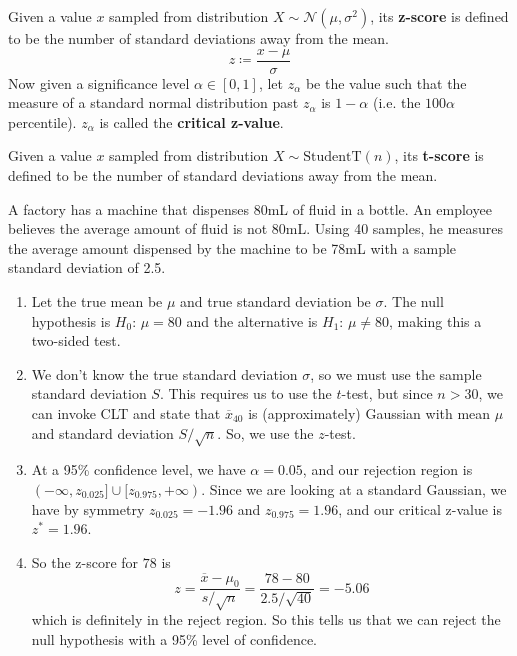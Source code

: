   \begin{definition}[Z-score]
    Given a value $x$ sampled from distribution $X \sim \mathcal{N}(\mu, \sigma^2)$, its \textbf{z-score} is defined to be the number of standard deviations away from the mean. 
    \begin{equation}
      z \coloneqq \frac{x - \mu}{\sigma}
    \end{equation}
    Now given a significance level $\alpha \in [0, 1]$, let $z_\alpha$ be the value such that the measure of a standard normal distribution past $z_\alpha$ is $1 - \alpha$ (i.e. the $100\alpha$ percentile). $z_\alpha$ is called the \textbf{critical z-value}.
  \end{definition}

  \begin{definition}[T-score]
    Given a value $x$ sampled from distribution $X \sim \mathrm{StudentT}(n)$, its \textbf{t-score} is defined to be the number of standard deviations away from the mean. 
  \end{definition}

  \begin{example}
    A factory has a machine that dispenses 80mL of fluid in a bottle. An employee believes the average amount of fluid is not 80mL. Using 40 samples, he measures the average amount dispensed by the machine to be 78mL with a sample standard deviation of 2.5. 
    \begin{enumerate}
      \item Let the true mean be $\mu$ and true standard deviation be $\sigma$. The null hypothesis is $H_0 : \, \mu = 80$ and the alternative is $H_1 : \, \mu \neq 80$, making this a two-sided test. 
      
      \item We don't know the true standard deviation $\sigma$, so we must use the sample standard deviation $S$. This requires us to use the $t$-test, but since $n > 30$, we can invoke CLT and state that $\overline{x}_{40}$ is (approximately) Gaussian with mean $\mu$ and standard deviation $S / \sqrt{n}$. So, we use the $z$-test. 
      
      \item At a 95\% confidence level, we have $\alpha = 0.05$, and our rejection region is $(-\infty, z_{0.025}] \cup [z_{0.975}, +\infty)$. Since we are looking at a standard Gaussian, we have by symmetry $z_{0.025} = -1.96$ and $z_{0.975} = 1.96$, and our critical z-value is $z^\ast = 1.96$. 
      
      \item So the z-score for $78$ is 
      \begin{equation}
        z = \frac{\overline{x} - \mu_0}{s / \sqrt{n}} = \frac{78 - 80}{2.5 / \sqrt{40}} = -5.06
      \end{equation}
      which is definitely in the reject region. So this tells us that we can reject the null hypothesis with a 95\% level of confidence. 
    \end{enumerate}
  \end{example}

